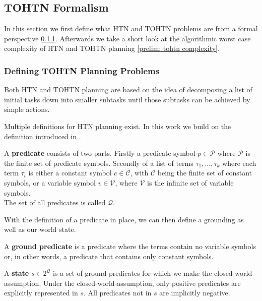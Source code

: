\subsection{TOHTN Formalism}
In this section we first define what HTN and TOHTN problems are from a formal perspective \ref{prelim: tohtn problems}. Afterwards we take a short look at the algorithmic worst case complexity of HTN and TOHTN planning \ref{prelim: tohtn complexity}.

\subsubsection{Defining TOHTN Planning Problems}
\label{prelim: tohtn problems}
Both HTN and TOHTN planning are based on the idea of decomposing a list of initial tasks down into smaller subtasks until those subtasks can be achieved by simple actions.

Multiple definitions for HTN planning exist. In this work we build on the definition introduced in \cite{georgievski2015htn}.

\begin{definition} %
	A \textbf{predicate} consists of two parts. Firstly a predicate symbol $p \in \mathcal{P}$ where $\mathcal{P}$ is the finite set of predicate symbols. Secondly of a list of terms $\tau_1, \ldots, \tau_k$ where each term $\tau_i$ is either a constant symbol $c \in \mathcal{C}$, with $\mathcal{C}$ being the finite set of constant symbols, or a variable symbol $v \in \mathcal{V}$, where $\mathcal{V}$ is the infinite set of variable symbols. \\
	The set of all predicates is called $\mathcal{Q}$.
\end{definition}
With the definition of a predicate in place, we can then define a grounding as well as our world state.
\begin{definition} %
	A \textbf{ground predicate} is a predicate where the terms contain no variable symbols or, in other words, a predicate that contains only constant symbols.
\end{definition}
\begin{definition} %
	A \textbf{state} $s \in 2^{\mathcal{Q}}$ is a set of ground predicates for which we make the closed-world-assumption. Under the closed-world-assumption, only positive predicates are explicitly represented in $s$. All predicates not in $s$ are implicitly negative.
\end{definition}

